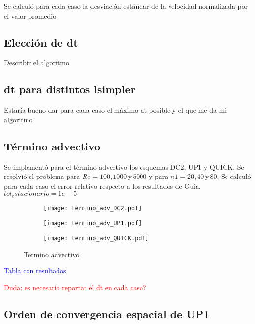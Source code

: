 \documentclass[aps,prb,twocolumn,superscriptaddress,floatfix,longbibliography,10pt]{revtex4-2}
\newcounter{para}
\begin{document}
Se calculó para cada caso la desviación estándar de la velocidad normalizada por el valor promedio

\subsection{Elección de dt}
Describir el algoritmo

\subsection{dt para distintos lsimpler}

Estaría bueno dar para cada caso el máximo dt posible y el que me da mi algoritmo

\subsection{Término advectivo}

Se implementó para el término advectivo los esquemas DC2, UP1 y QUICK. Se resolvió el problema para $Re = 100, 1000 \, \mathrm{y} \, 5000$ y para $n1 = 20, 40 \, \mathrm{y} \, 80$. Se calculó para cada caso el error relativo respecto a los resultados de Guia.
$tol_estacionario = 1e-5$

\begin{figure}
  \centering
  \begin{subfigure}[b]{0.3\textwidth}
      \centering
      \texttt{[image: termino\_adv\_DC2.pdf]}
      \caption{}
      \label{fig:termino_adv_DC2}
  \end{subfigure}
  \hfill
  \begin{subfigure}[b]{0.3\textwidth}
      \centering
      \texttt{[image: termino\_adv\_UP1.pdf]}
      \caption{}
      \label{fig:termino_adv_UP1}
  \end{subfigure}
  \hfill
  \begin{subfigure}[b]{0.3\textwidth}
      \centering
      \texttt{[image: termino\_adv\_QUICK.pdf]}
      \caption{}
      \label{fig:termino_adv_QUICK}
  \end{subfigure}
     \caption{Termino advectivo}
     \label{fig:termino_advectivo}
\end{figure}

\textcolor{blue}{Tabla con resultados}

\textcolor{red}{Duda: es necesario reportar el dt en cada caso?}

\subsection{Orden de convergencia espacial de UP1}
\end{document}
